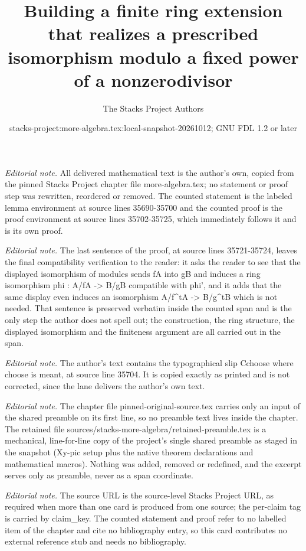 \documentclass[10pt,a4paper]{amsart}
\title{Building a finite ring extension that realizes a prescribed isomorphism modulo a fixed power of a nonzerodivisor}
\author{The Stacks Project Authors}
\date{stacks-project:more-algebra.tex:local-snapshot-20261012; GNU FDL 1.2 or later}
\theoremstyle{plain}
\theoremstyle{definition}
\theoremstyle{remark}
\numberwithin{equation}{subsection}
\begin{document}
\maketitle
\setcounter{subsection}{1}
\noindent\textit{Editorial note.} All delivered mathematical text is the author's own, copied from the pinned Stacks Project chapter file more-algebra.tex; no statement or proof step was rewritten, reordered or removed. The counted statement is the labeled lemma environment at source lines 35690-35700 and the counted proof is the proof environment at source lines 35702-35725, which immediately follows it and is its own proof.\par\medskip
\noindent\textit{Editorial note.} The last sentence of the proof, at source lines 35721-35724, leaves the final compatibility verification to the reader: it asks the reader to see that the displayed isomorphism of modules sends fA into gB and induces a ring isomorphism phi : A/fA -> B/gB compatible with phi', and it adds that the same display even induces an isomorphism A/f\textasciicircum{}tA -> B/g\textasciicircum{}tB which is not needed. That sentence is preserved verbatim inside the counted span and is the only step the author does not spell out; the construction, the ring structure, the displayed isomorphism and the finiteness argument are all carried out in the span.\par\medskip
\noindent\textit{Editorial note.} The author's text contains the typographical slip Cchoose where choose is meant, at source line 35704. It is copied exactly as printed and is not corrected, since the lane delivers the author's own text.\par\medskip
\noindent\textit{Editorial note.} The chapter file pinned-original-source.tex carries only an input of the shared preamble on its first line, so no preamble text lives inside the chapter. The retained file sources/stacks-more-algebra/retained-preamble.tex is a mechanical, line-for-line copy of the project's single shared preamble as staged in the snapshot (Xy-pic setup plus the native theorem declarations and mathematical macros). Nothing was added, removed or redefined, and the excerpt serves only as preamble, never as a span coordinate.\par\medskip
\noindent\textit{Editorial note.} The source URL is the source-level Stacks Project URL, as required when more than one card is produced from one source; the per-claim tag is carried by claim\_key. The counted statement and proof refer to no labelled item of the chapter and cite no bibliography entry, so this card contributes no external reference stub and needs no bibliography.\par\medskip
\end{document}
